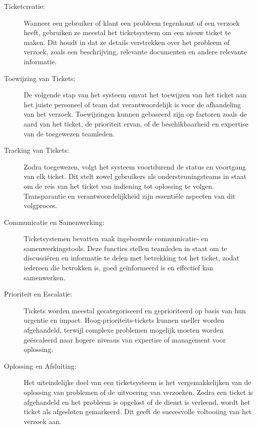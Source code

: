  \begin{description}
  \item[Ticketcreatie:] Wanneer een gebruiker of klant een probleem tegenkomt of een verzoek heeft, gebruiken ze meestal het ticketsysteem om een nieuw ticket te maken. Dit houdt in dat ze details verstrekken over het probleem of verzoek, zoals een beschrijving, relevante documenten en andere relevante informatie.

  \item[Toewijzing van Tickets:] De volgende stap van het systeem omvat het toewijzen van het ticket aan het juiste personeel of team dat verantwoordelijk is voor de afhandeling van het verzoek. Toewijzingen kunnen gebaseerd zijn op factoren zoals de aard van het ticket, de prioriteit ervan, of de beschikbaarheid en expertise van de toegewezen teamleden.

  \item[Tracking van Tickets:] Zodra toegewezen, volgt het systeem voortdurend de status en voortgang van elk ticket. Dit stelt zowel gebruikers als ondersteuningsteams in staat om de reis van het ticket van indiening tot oplossing te volgen. Transparantie en verantwoordelijkheid zijn essentiële aspecten van dit volgproces.

  \item[Communicatie en Samenwerking:] Ticketsystemen bevatten vaak ingebouwde communicatie- en samenwerkingstools. Deze functies stellen teamleden in staat om te discussiëren en informatie te delen met betrekking tot het ticket, zodat iedereen die betrokken is, goed geïnformeerd is en effectief kan samenwerken.

  \item[Prioriteit en Escalatie:] Tickets worden meestal gecategoriseerd en geprioriteerd op basis van hun urgentie en impact. Hoog-prioriteits-tickets kunnen sneller worden afgehandeld, terwijl complexe problemen mogelijk moeten worden geëscaleerd naar hogere niveaus van expertise of management voor oplossing.

  \item[Oplossing en Afsluiting:] Het uiteindelijke doel van een ticketsysteem is het vergemakkelijken van de oplossing van problemen of de uitvoering van verzoeken. Zodra een ticket is afgehandeld en het probleem is opgelost of de dienst is verleend, wordt het ticket als afgesloten gemarkeerd. Dit geeft de succesvolle voltooiing van het verzoek aan.
 \end{description}


